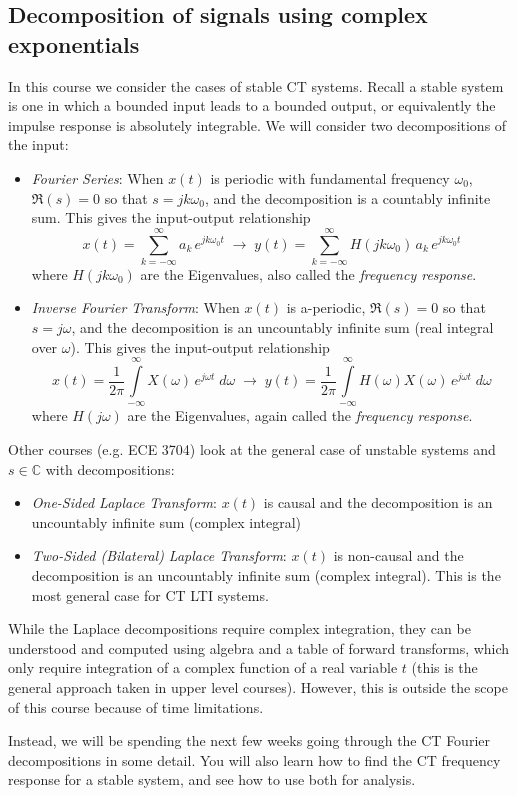 \subsection{Decomposition of signals using complex exponentials}

In this course we consider the cases of stable CT systems. Recall a stable system is one in which a bounded input leads to a bounded output, or equivalently the impulse response is absolutely integrable. We will consider two decompositions of the input:

  \begin{itemize}
  \item \emph{Fourier Series}: When $x(t)$ is periodic with fundamental frequency $\omega_0$, $\Re{(s)} = 0$ so that $s = jk\omega_0$, and the decomposition is a countably infinite sum. This gives the input-output relationship
    \[
    x(t) = \sum\limits_{k = -\infty}^{\infty} a_k \, e^{j k\omega_0 t} \; \longrightarrow\; y(t) = \sum\limits_{k = -\infty}^{\infty} H(j k\omega_0)\, a_k \, e^{j k\omega_0 t}
    \]
    where $H(j k\omega_0)$ are the Eigenvalues, also called the \emph{frequency response}.
  \item \emph{Inverse Fourier Transform}: When $x(t)$ is a-periodic, $\Re{(s)} = 0$ so that $s = j\omega$, and the decomposition is an uncountably infinite sum (real integral over $\omega$). This gives the input-output relationship
    \[
    x(t) = \frac{1}{2\pi}\int\limits_{-\infty}^{\infty} X(\omega) \, e^{j \omega t}\; d\omega \;\longrightarrow\; y(t) = \frac{1}{2\pi}\int\limits_{-\infty}^{\infty} H(\omega) X(\omega) \, e^{j \omega t}\; d\omega
    \]
    where $H(j \omega)$ are the Eigenvalues, again called the \emph{frequency response}.  
  \end{itemize}

  Other courses (e.g. ECE 3704) look at the general case of unstable systems and $s \in \mathbb{C}$ with decompositions:

  \begin{itemize}
  \item \emph{One-Sided Laplace Transform}: $x(t)$ is causal and the decomposition is an uncountably infinite sum (complex integral)
  \item \emph{Two-Sided (Bilateral) Laplace Transform}: $x(t)$ is non-causal and the decomposition is an uncountably infinite sum (complex integral). This is the most general case for CT LTI systems.
  \end{itemize}

  While the Laplace decompositions require complex integration, they can be understood and computed using algebra and a table of forward transforms, which only require integration of a complex function of a real variable $t$ (this is the general approach taken in upper level courses). However, this is outside the scope of this course because of time limitations.

Instead, we will be spending the next few weeks going through the CT Fourier decompositions in some detail. You will also learn how to find the CT frequency response for a stable system, and see how to use both for analysis.

